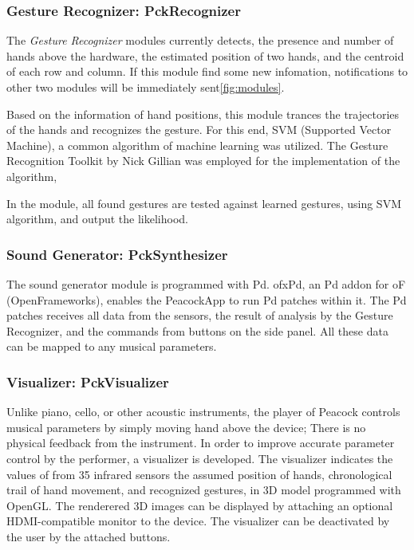 \documentclass{nime-alternate}
\begin{document}
\subsubsection{Gesture Recognizer: PckRecognizer}

The {\it Gesture Recognizer} modules currently detects, the presence and number of hands above the hardware, the estimated position of two hands, and the centroid of each row and column. 
If this module find some new infomation, notifications to other two modules will be immediately sent\ref{fig:modules}.

Based on the information of hand positions, this module trances the trajectories of the hands and recognizes the gesture. For this end,  SVM (Supported Vector Machine), a common algorithm of machine learning was utilized.  The Gesture Recognition Toolkit by Nick Gillian was employed for 
the implementation of the algorithm,

In the module, all found gestures are tested against learned gestures, using SVM algorithm, and output the likelihood. 

\subsubsection{Sound Generator: PckSynthesizer}

The sound generator module is programmed with Pd\cite{Pd}. ofxPd\cite{ofxPd}, an Pd addon for oF\\(OpenFrameworks), enables the PeacockApp to run Pd patches within it. The Pd patches receives all data from the sensors, the result of analysis by the Gesture Recognizer, and the commands from buttons on the side panel. All these data can be mapped to any musical parameters.
 
\subsubsection{Visualizer: PckVisualizer}

Unlike piano, cello, or other acoustic instruments, the player of Peacock controls musical parameters by simply moving hand above the device; There is no physical feedback from the instrument. In order to improve accurate parameter control by the performer, a visualizer is developed.  The visualizer indicates the values of from 35 infrared sensors  the assumed position of hands, chronological trail of hand movement, and recognized gestures, in  3D model programmed with OpenGL\cite{OpenGL}. The renderered 3D images can be displayed by attaching an optional HDMI-compatible monitor to the device.
The visualizer can be deactivated by the user by the attached buttons.
\end{document}
